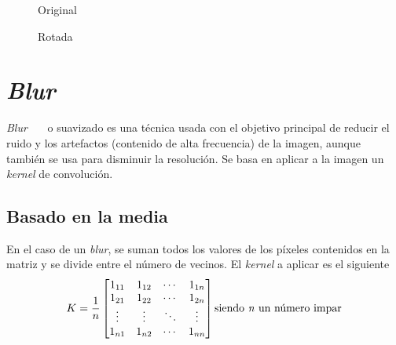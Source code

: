 \begin{figure}[H]
  \caption{Original}
  \centering \setlength\fboxsep{0pt} \setlength\fboxrule{0.5pt}
\end{figure}

\begin{figure}[H]
  \centering \setlength\fboxsep{0pt} \setlength\fboxrule{0.5pt}
  \caption{Rotada}
\end{figure}

\section{\emph{Blur}}
\emph{Blur}~\emph{\citep*[Smoothing]{opencv_book-bib}}~\emph{\citep*[3.3.1
  Non-linear filtering]{szeliski2010computer}}~\emph{\citep*[4.3 Noise
  Reduction]{toennies2012guide}} o suavizado es una técnica usada con
el objetivo principal de reducir el ruido y los artefactos (contenido
de alta frecuencia) de la imagen, aunque también se usa para disminuir
la resolución. Se basa en aplicar a la imagen un \emph{kernel} de
convolución.
\subsection{Basado en la media}
En el caso de un \emph{blur}, se suman todos los valores de los
píxeles contenidos en la matriz y se divide entre el número de
vecinos. El \emph{kernel} a aplicar es el siguiente
\begin{equation*}
  K = \frac{1}{n}
  \begin{bmatrix}
    1_{11} & 1_{12} & \cdots & 1_{1n} \\
    1_{21} & 1_{22} & \cdots & 1_{2n} \\
    \vdots & \vdots & \ddots & \vdots \\
    1_{n1} & 1_{n2} & \cdots & 1_{nn} \\
  \end{bmatrix}
  \text{siendo \emph{n} un número impar}
\end{equation*}

